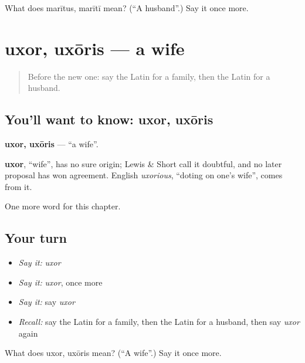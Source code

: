 \begin{tcolorbox}[breakable,colback=teal!4,colframe=teal!35!black,title={Before you move on}]
What does marītus, marītī mean? (\textquotedblleft{}A husband\textquotedblright{}.) Say it once more.
\end{tcolorbox}
\section[uxor, uxōris]{uxor, uxōris — a wife}

\label{lesson:LA-C71-uxor}



\begin{quote}
Before the new one: say the Latin for a family, then the Latin for a husband.
\end{quote}

\subsection*{You'll want to know: uxor, uxōris}
\textbf{uxor, uxōris} — \textquotedblleft{}a wife\textquotedblright{}.

\begin{cousinweb}
\textbf{uxor}, \textquotedblleft{}wife\textquotedblright{}, has no sure origin; Lewis \& Short call it doubtful, and no later proposal has won agreement. English \emph{uxorious}, \textquotedblleft{}doting on one's wife\textquotedblright{}, comes from it.
\end{cousinweb}

\begin{grammarlens}[title={What you've built}]
One more word for this chapter.
\end{grammarlens}

\subsection*{Your turn}
\begin{itemize}
\raggedright
  \item \emph{Say it:} \emph{uxor}
  \item \emph{Say it:} \emph{uxor}, once more
  \item \emph{Say it:} say \emph{uxor}
  \item \emph{Recall:} say the Latin for a family, then the Latin for a husband, then say \emph{uxor} again
\end{itemize}

\begin{tcolorbox}[breakable,colback=teal!4,colframe=teal!35!black,title={Before you move on}]
What does uxor, uxōris mean? (\textquotedblleft{}A wife\textquotedblright{}.) Say it once more.
\end{tcolorbox}
